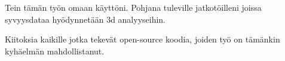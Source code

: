 Tein tämän työn omaan käyttöni. Pohjana tuleville jatkotöilleni joissa syvyysdataa hyödynnetään 3d analyyseihin.

Kiitoksia kaikille jotka tekevät open-source koodia, joiden työ on tämänkin kyhäelmän mahdollistanut.